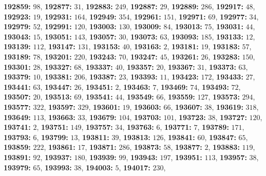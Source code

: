 \textsf{\bfseries 192859:} $98$, \textsf{\bfseries 192877:} $31$, \textsf{\bfseries 192883:} $249$, \textsf{\bfseries 192887:} $29$, \textsf{\bfseries 192889:} $286$, \textsf{\bfseries 192917:} $48$, \textsf{\bfseries 192923:} $19$, \textsf{\bfseries 192931:} $164$, \textsf{\bfseries 192949:} $354$, \textsf{\bfseries 192961:} $151$, \textsf{\bfseries 192971:} $69$, \textsf{\bfseries 192977:} $34$, \textsf{\bfseries 192979:} $52$, \textsf{\bfseries 192991:} $120$, \textsf{\bfseries 193003:} $130$, \textsf{\bfseries 193009:} $84$, \textsf{\bfseries 193013:} $75$, \textsf{\bfseries 193031:} $44$, \textsf{\bfseries 193043:} $15$, \textsf{\bfseries 193051:} $143$, \textsf{\bfseries 193057:} $30$, \textsf{\bfseries 193073:} $63$, \textsf{\bfseries 193093:} $185$, \textsf{\bfseries 193133:} $12$, \textsf{\bfseries 193139:} $112$, \textsf{\bfseries 193147:} $131$, \textsf{\bfseries 193153:} $40$, \textsf{\bfseries 193163:} $2$, \textsf{\bfseries 193181:} $19$, \textsf{\bfseries 193183:} $57$, \textsf{\bfseries 193189:} $78$, \textsf{\bfseries 193201:} $220$, \textsf{\bfseries 193243:} $70$, \textsf{\bfseries 193247:} $45$, \textsf{\bfseries 193261:} $26$, \textsf{\bfseries 193283:} $150$, \textsf{\bfseries 193301:} $28$, \textsf{\bfseries 193327:} $68$, \textsf{\bfseries 193337:} $40$, \textsf{\bfseries 193357:} $20$, \textsf{\bfseries 193367:} $31$, \textsf{\bfseries 193373:} $63$, \textsf{\bfseries 193379:} $10$, \textsf{\bfseries 193381:} $206$, \textsf{\bfseries 193387:} $23$, \textsf{\bfseries 193393:} $11$, \textsf{\bfseries 193423:} $172$, \textsf{\bfseries 193433:} $27$, \textsf{\bfseries 193441:} $63$, \textsf{\bfseries 193447:} $26$, \textsf{\bfseries 193451:} $2$, \textsf{\bfseries 193463:} $7$, \textsf{\bfseries 193469:} $74$, \textsf{\bfseries 193493:} $72$, \textsf{\bfseries 193507:} $20$, \textsf{\bfseries 193513:} $69$, \textsf{\bfseries 193541:} $44$, \textsf{\bfseries 193549:} $66$, \textsf{\bfseries 193559:} $127$, \textsf{\bfseries 193573:} $294$, \textsf{\bfseries 193577:} $322$, \textsf{\bfseries 193597:} $329$, \textsf{\bfseries 193601:} $19$, \textsf{\bfseries 193603:} $66$, \textsf{\bfseries 193607:} $38$, \textsf{\bfseries 193619:} $318$, \textsf{\bfseries 193649:} $113$, \textsf{\bfseries 193663:} $33$, \textsf{\bfseries 193679:} $104$, \textsf{\bfseries 193703:} $101$, \textsf{\bfseries 193723:} $38$, \textsf{\bfseries 193727:} $120$, \textsf{\bfseries 193741:} $2$, \textsf{\bfseries 193751:} $149$, \textsf{\bfseries 193757:} $34$, \textsf{\bfseries 193763:} $6$, \textsf{\bfseries 193771:} $7$, \textsf{\bfseries 193789:} $171$, \textsf{\bfseries 193793:} $6$, \textsf{\bfseries 193799:} $13$, \textsf{\bfseries 193811:} $39$, \textsf{\bfseries 193813:} $126$, \textsf{\bfseries 193841:} $60$, \textsf{\bfseries 193847:} $65$, \textsf{\bfseries 193859:} $222$, \textsf{\bfseries 193861:} $17$, \textsf{\bfseries 193871:} $286$, \textsf{\bfseries 193873:} $58$, \textsf{\bfseries 193877:} $2$, \textsf{\bfseries 193883:} $119$, \textsf{\bfseries 193891:} $92$, \textsf{\bfseries 193937:} $180$, \textsf{\bfseries 193939:} $99$, \textsf{\bfseries 193943:} $197$, \textsf{\bfseries 193951:} $113$, \textsf{\bfseries 193957:} $38$, \textsf{\bfseries 193979:} $65$, \textsf{\bfseries 193993:} $38$, \textsf{\bfseries 194003:} $5$, \textsf{\bfseries 194017:} $230$, 
